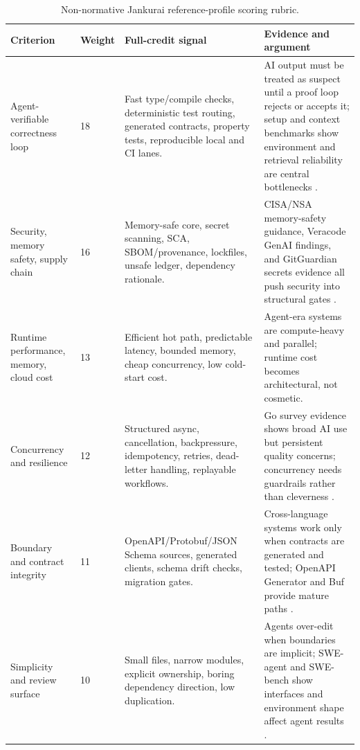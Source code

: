 \begin{table}[t]
\caption{Non-normative Jankurai reference-profile scoring rubric.}
\label{tab:stack-rubric}
\centering
\small
\begin{tabularx}{\textwidth}{L{0.21\textwidth} L{0.07\textwidth} Y Y}
\toprule
\textbf{Criterion} & \textbf{Weight} & \textbf{Full-credit signal} & \textbf{Evidence and argument} \\
\midrule
Agent-verifiable correctness loop & 18 & Fast type/compile checks, deterministic test routing, generated contracts, property tests, reproducible local and CI lanes. & AI output must be treated as suspect until a proof loop rejects or accepts it; setup and context benchmarks show environment and retrieval reliability are central bottlenecks \cite{setupBench2025,contextBench2026}. \\
Security, memory safety, supply chain & 16 & Memory-safe core, secret scanning, SCA, SBOM/provenance, lockfiles, unsafe ledger, dependency rationale. & CISA/NSA memory-safety guidance, Veracode GenAI findings, and GitGuardian secrets evidence all push security into structural gates \cite{cisaMemorySafeLanguages2025,veracodeGenaiCodeSecurity2025,gitguardianSecretsSprawl2026}. \\
Runtime performance, memory, cloud cost & 13 & Efficient hot path, predictable latency, bounded memory, cheap concurrency, low cold-start cost. & Agent-era systems are compute-heavy and parallel; runtime cost becomes architectural, not cosmetic. \\
Concurrency and resilience & 12 & Structured async, cancellation, backpressure, idempotency, retries, dead-letter handling, replayable workflows. & Go survey evidence shows broad AI use but persistent quality concerns; concurrency needs guardrails rather than cleverness \cite{goDeveloperSurvey2025}. \\
Boundary and contract integrity & 11 & OpenAPI/Protobuf/JSON Schema sources, generated clients, schema drift checks, migration gates. & Cross-language systems work only when contracts are generated and tested; OpenAPI Generator and Buf provide mature paths \cite{openapiGeneratorUsage2026,bufDocs2026}. \\
Simplicity and review surface & 10 & Small files, narrow modules, explicit ownership, boring dependency direction, low duplication. & Agents over-edit when boundaries are implicit; SWE-agent and SWE-bench show interfaces and environment shape affect agent results \cite{sweAgentAci2024,sweBench2024}. \\

\end{tabularx}
\end{table}
